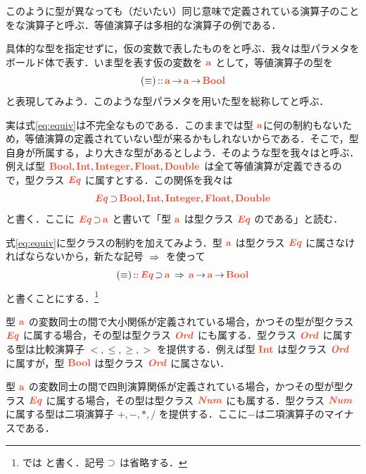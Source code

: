 \documentclass[a5paper,twoside,fleqn,draft]{jsbook}
\begin{document}
このように型が異なっても（だいたい）同じ意味で定義されている演算子のことをな演算子と呼ぶ．等値演算子は多相的な演算子の例である．

具体的な型を指定せずに，仮の変数で表したものをと呼ぶ．我々は型パラメタをボールド体で表す．いま型を表す仮の変数を $\mA $ として，等値演算子の型を
\begin{equation}
  \label{eq:equiv}
  (\hIfEq)
  \mIn\mA\mFuncArrow\mA\mFuncArrow\mBoolType
\end{equation}
と表現してみよう．このような型パラメタを用いた型を総称してと呼ぶ．

実は式\eqref{eq:equiv}は不完全なものである．このままでは型 $\mA $に何の制約もないため，等値演算の定義されていない型が来るかもしれないからである．そこで，型自身が所属する，より大きな型があるとしよう．そのような型を我々はと呼ぶ．例えば型 $\mBoolType,\mIntType,\mIntegerType,\mFloatType,\mDoubleType$ は全て等値演算が定義できるので，型クラス $\mEqTypeClass$ に属すとする．この関係を我々は
\begin{equation}
  \mEqTypeClass
  \mSuperSet\mBoolType,\mIntType,\mIntegerType,\mFloatType,\mDoubleType
\end{equation}
と書く．ここに $\mEqTypeClass\mSuperSet\mA$ と書いて「型 $\mA$ は型クラス $\mEqTypeClass$ のである」と読む．

式\eqref{eq:equiv}に型クラスの制約を加えてみよう．型 $\mA$ は型クラス $\mEqTypeClass$ に属さなければならないから，新たな記号 $\operatorname{\;\Rightarrow\;}$ を使って
\begin{equation}
  (\hIfEq)
  \mIn{}\mEqTypeClass\mSuperSet\mA
  \mSuperClass\mA\mFuncArrow\mA\mFuncArrow\mBoolType
\end{equation}
と書くことにする．\footnote{\haskell では  と書く．記号 $\operatorname{\supset}$ は省略する．}

型 $\mA$ の変数同士の間で大小関係が定義されている場合，かつその型が型クラス $\mEqTypeClass$ に属する場合，その型は型クラス $\mOrdTypeClass$ にも属する．型クラス $\mOrdTypeClass$ に属する型は比較演算子 $<,\le,\ge,>$ を提供する．例えば型 $\mIntType$ は型クラス $\mOrdTypeClass$ に属すが，型 $\mBoolType$ は型クラス $\mOrdTypeClass$ に属さない．

型 $\mA$ の変数同士の間で四則演算関係が定義されている場合，かつその型が型クラス $\mEqTypeClass$ に属する場合，その型は型クラス $\mNumTypeClass$ にも属する．型クラス $\mNumTypeClass$ に属する型は二項演算子 $+,-,*,/$ を提供する．ここに$-$は二項演算子のマイナスである．
\end{document}
